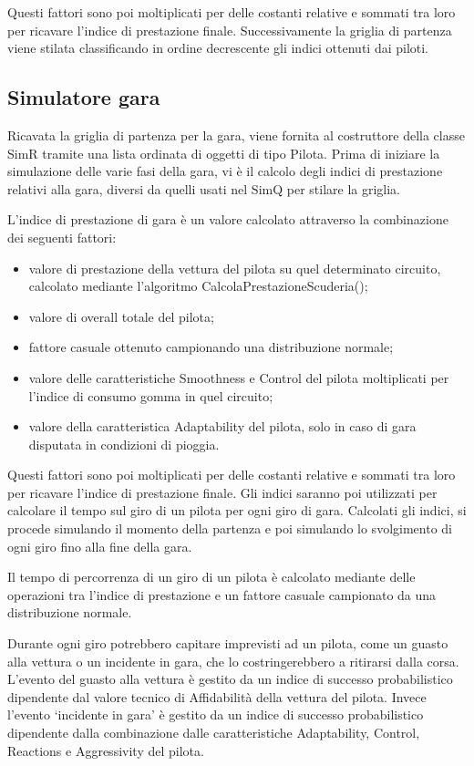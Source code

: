 Questi fattori sono poi moltiplicati per delle costanti relative e sommati tra loro per ricavare l’indice di prestazione finale. Successivamente la griglia di partenza viene stilata classificando in ordine decrescente gli indici ottenuti dai piloti.


\subsection{Simulatore gara}
Ricavata la griglia di partenza per la gara, viene fornita al costruttore della classe SimR tramite una lista ordinata di oggetti di tipo Pilota. Prima di iniziare la simulazione delle varie fasi della gara, vi è il calcolo degli indici di prestazione relativi alla gara, diversi da quelli usati nel SimQ per stilare la griglia.

L’indice di prestazione di gara è un valore calcolato attraverso la combinazione dei seguenti fattori:
\begin{itemize}
    \item valore di prestazione della vettura del pilota su quel determinato circuito, calcolato mediante l’algoritmo CalcolaPrestazioneScuderia();
    \item valore di overall totale del pilota;
    \item fattore casuale ottenuto campionando una distribuzione normale;
    \item valore delle caratteristiche Smoothness e Control del pilota moltiplicati per l’indice di consumo gomma in quel circuito;
    \item valore della caratteristica Adaptability del pilota, solo in caso di gara disputata in condizioni di pioggia.
\end{itemize}

Questi fattori sono poi moltiplicati per delle costanti relative e sommati tra loro per ricavare l’indice di prestazione finale. Gli indici saranno poi utilizzati per calcolare il tempo sul giro di un pilota per ogni giro di gara. Calcolati gli indici, si procede simulando il momento della partenza e poi simulando lo svolgimento di ogni giro fino alla fine della gara.

Il tempo di percorrenza di un giro di un pilota è calcolato mediante delle operazioni tra l’indice di prestazione e un fattore casuale campionato da una distribuzione normale.

Durante ogni giro potrebbero capitare imprevisti ad un pilota, come un guasto alla vettura o un incidente in gara, che lo costringerebbero a ritirarsi dalla corsa. L’evento del guasto alla vettura è gestito da un indice di successo probabilistico dipendente dal valore tecnico di Affidabilità della vettura del pilota. Invece l’evento ‘incidente in gara’ è gestito da un indice di successo probabilistico dipendente dalla combinazione dalle caratteristiche Adaptability, Control, Reactions e Aggressivity del pilota.

